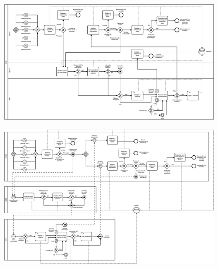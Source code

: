 \documentclass{article}
\begin{document}
    \begin{figure}[H]
        \centering
        \includegraphics[angle=-90,origin=c, scale = 0.11]{one_pool.png}
    \end{figure}

    \pagebreak


    \begin{figure}[H]
        \centering
        \includegraphics[angle=-90,origin=c, scale = 0.11]{various_pools.png}
    \end{figure}
\end{document}
